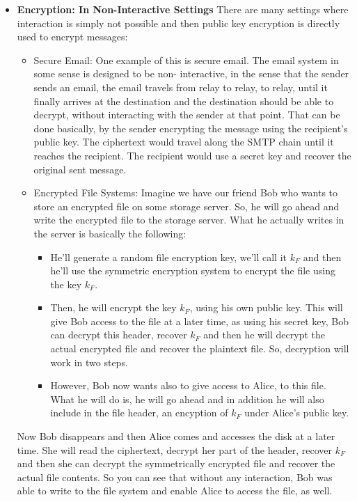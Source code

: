 \documentclass[11pt]{article}
\providecommand{\tightlist}{%
      \setlength{\itemsep}{0pt}\setlength{\parskip}{0pt}}
\begin{document}
\begin{itemize}
\item
  \textbf{Encryption: In Non-Interactive Settings} There are many
  settings where interaction is simply not possible and then public key
  encryption is directly used to encrypt messages:

  \begin{itemize}
  \item
    Secure Email: One example of this is secure email. The email system
    in some sense is designed to be non- interactive, in the sense that
    the sender sends an email, the email travels from relay to relay, to
    relay, until it finally arrives at the destination and the
    destination should be able to decrypt, without interacting with the
    sender at that point. That can be done basically, by the sender
    encrypting the message using the recipient's public key. The
    ciphertext would travel along the SMTP chain until it reaches the
    recipient. The recipient would use a secret key and recover the
    original sent message.
  \item
    Encrypted File Systems: Imagine we have our friend Bob who wants to
    store an encrypted file on some storage server. So, he will go ahead
    and write the encrypted file to the storage server. What he actually
    writes in the server is basically the following:

    \begin{itemize}
    \tightlist
    \item
      He'll generate a random file encryption key, we'll call it
      \(k_{F}\) and then he'll use the symmetric encryption system to
      encrypt the file using the key \(k_{F}\).
    \item
      Then, he will encrypt the key \(k_{F}\), using his own public key.
      This will give Bob access to the file at a later time, as using
      his secret key, Bob can decrypt this header, recover \(k_{F}\) and
      then he will decrypt the actual encrypted file and recover the
      plaintext file. So, decryption will work in two steps.
    \item
      However, Bob now wants also to give access to Alice, to this file.
      What he will do is, he will go ahead and in addition he will also
      include in the file header, an encyption of \(k_{F}\) under
      Alice's public key.
    \end{itemize}
  \end{itemize}

  Now Bob disappears and then Alice comes and accesses the disk at a
  later time. She will read the ciphertext, decrypt her part of the
  header, recover \(k_{F}\) and then she can decrypt the symmetrically
  encrypted file and recover the actual file contents. So you can see
  that without any interaction, Bob was able to write to the file system
  and enable Alice to access the file, as well.


\end{itemize}
\end{document}
